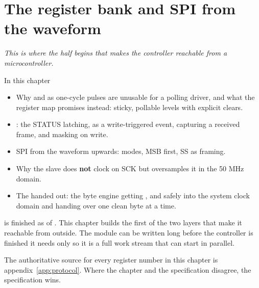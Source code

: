 
\chapter{The register bank and SPI from the waveform}
\label{c18:ch}

{\large\itshape This is where the half begins that makes the controller reachable from a
microcontroller.\par}

\begin{chapterbox}{In this chapter}
\begin{itemize}
  \item Why  and  as one-cycle pulses are unusable for a polling driver,
    and what the register map promises instead: sticky, pollable levels with explicit clears.
  \item {}: the STATUS latching,  as a write-triggered event,
    capturing a received frame, and masking on write.
  \item SPI from the waveform upwards: modes, MSB first, SS as framing.
  \item Why the slave does \textbf{not} clock on SCK but oversamples it in the 50 MHz domain.
  \item The  handed out: the byte engine getting ,  and
     safely into the system clock domain and handing over one clean byte at a time.
\end{itemize}
\end{chapterbox}

 is finished as of . This chapter builds the first of the two
layers that make it reachable from outside. The module can be written long before the controller is
finished \textemdash{} it needs only  \textemdash{} so it is a full work stream that can
start in parallel.

The authoritative source for every register number in this chapter is appendix~\ref{app:protocol}.
Where the chapter and the specification disagree, the specification wins.





